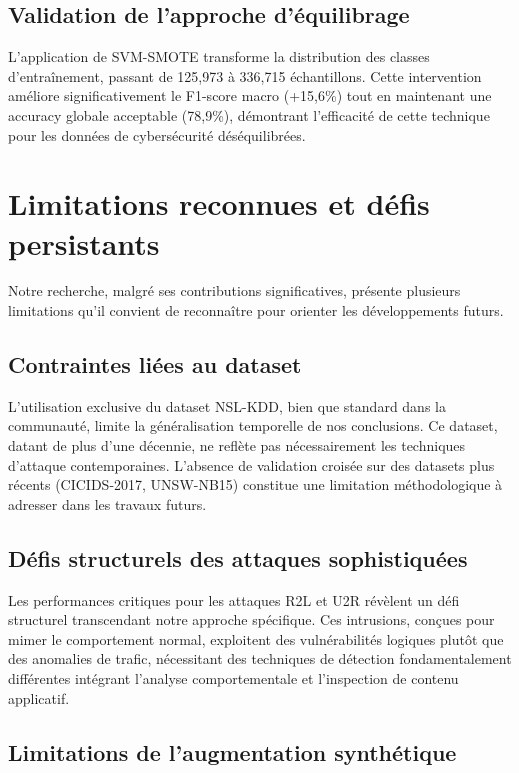 \subsection{Validation de l'approche d'équilibrage}

L'application de SVM-SMOTE transforme la distribution des classes d'entraînement, passant de 125,973 à 336,715 échantillons. Cette intervention améliore significativement le F1-score macro (+15,6\%) tout en maintenant une accuracy globale acceptable (78,9\%), démontrant l'efficacité de cette technique pour les données de cybersécurité déséquilibrées.

\section{Limitations reconnues et défis persistants}

Notre recherche, malgré ses contributions significatives, présente plusieurs limitations qu'il convient de reconnaître pour orienter les développements futurs.

\subsection{Contraintes liées au dataset}

L'utilisation exclusive du dataset NSL-KDD, bien que standard dans la communauté, limite la généralisation temporelle de nos conclusions. Ce dataset, datant de plus d'une décennie, ne reflète pas nécessairement les techniques d'attaque contemporaines. L'absence de validation croisée sur des datasets plus récents (CICIDS-2017, UNSW-NB15) constitue une limitation méthodologique à adresser dans les travaux futurs.

\subsection{Défis structurels des attaques sophistiquées}

Les performances critiques pour les attaques R2L et U2R révèlent un défi structurel transcendant notre approche spécifique. Ces intrusions, conçues pour mimer le comportement normal, exploitent des vulnérabilités logiques plutôt que des anomalies de trafic, nécessitant des techniques de détection fondamentalement différentes intégrant l'analyse comportementale et l'inspection de contenu applicatif.

\subsection{Limitations de l'augmentation synthétique}


